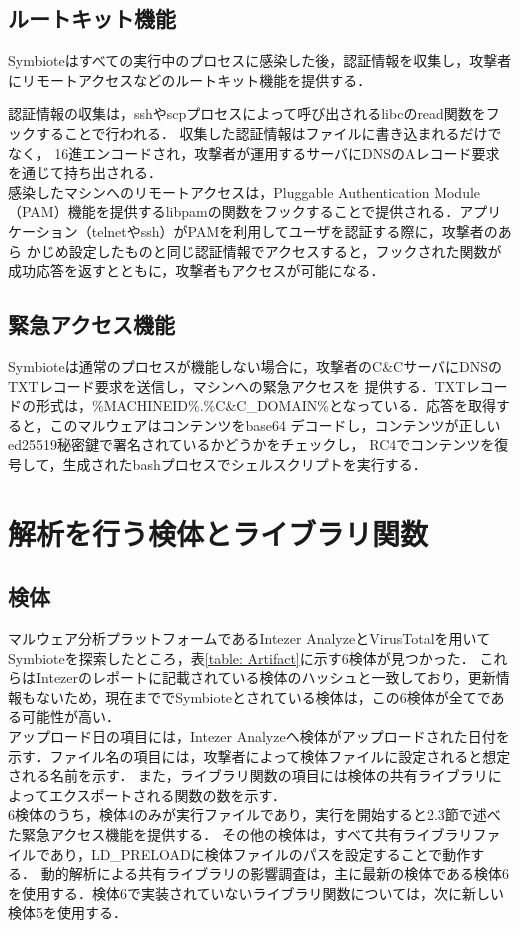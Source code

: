 \documentclass[submit,techreq,noauthor]{eco}	%
\begin{document}
\subsection{ルートキット機能}
Symbioteはすべての実行中のプロセスに感染した後，認証情報を収集し，攻撃者にリモートアクセスなどのルートキット機能を提供する．

認証情報の収集は，sshやscpプロセスによって呼び出されるlibcのread関数をフックすることで行われる．
収集した認証情報はファイルに書き込まれるだけでなく，
16進エンコードされ，攻撃者が運用するサーバにDNSのAレコード要求を通じて持ち出される．\\
\indent
感染したマシンへのリモートアクセスは，Pluggable Authentication
Module（PAM）機能を提供するlibpamの関数をフックすることで提供される．アプリケーション（telnetやssh）がPAMを利用してユーザを認証する際に，攻撃者のあら
かじめ設定したものと同じ認証情報でアクセスすると，フックされた関数が成功応答を返すとともに，攻撃者もアクセスが可能になる．

\subsection{緊急アクセス機能}
Symbioteは通常のプロセスが機能しない場合に，攻撃者のC\&CサーバにDNSのTXTレコード要求を送信し，マシンへの緊急アクセスを
提供する．TXTレコードの形式は，\%MACHINEID\%.\%C\&C\_DOMAIN\%となっている．応答を取得すると，このマルウェアはコンテンツをbase64
デコードし，コンテンツが正しいed25519秘密鍵で署名されているかどうかをチェックし，
RC4でコンテンツを復号して，生成されたbashプロセスでシェルスクリプトを実行する．\\


\section{解析を行う検体とライブラリ関数}
\subsection{検体}
マルウェア分析プラットフォームであるIntezer AnalyzeとVirusTotalを用いてSymbioteを探索したところ，表\ref{table: Artifact}に示す6検体が見つかった．
これらはIntezerのレポートに記載されている検体のハッシュと一致しており，更新情報もないため，現在まででSymbioteとされている検体は，この6検体が全てである可能性が高い．\\
アップロード日の項目には，Intezer Analyzeへ検体がアップロードされた日付を示す．ファイル名の項目には，攻撃者によって検体ファイルに設定されると想定される名前を示す．
また，ライブラリ関数の項目には検体の共有ライブラリによってエクスポートされる関数の数を示す．\\
\indent
6検体のうち，検体4のみが実行ファイルであり，実行を開始すると2.3節で述べた緊急アクセス機能を提供する．
その他の検体は，すべて共有ライブラリファイルであり，LD\_PRELOADに検体ファイルのパスを設定することで動作する．
動的解析による共有ライブラリの影響調査は，主に最新の検体である検体6を使用する．検体6で実装されていないライブラリ関数については，次に新しい検体5を使用する．
\end{document}
